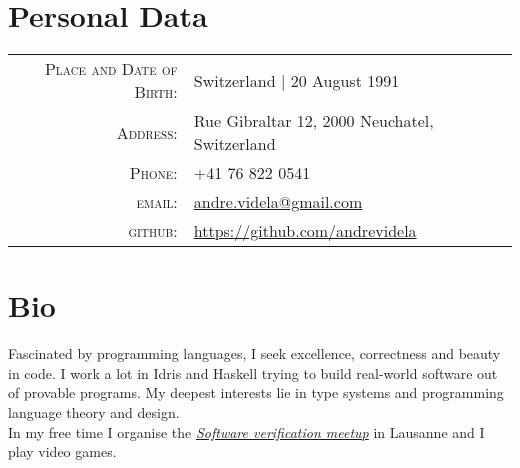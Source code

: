 \documentclass[a4paper,10pt]{article} %
\begin{document}
\pagestyle{empty} %


\par{\bigskip\par} %
\par{\bigskip\par} %
\section{Personal Data}

\begin{tabular}{rl}
\textsc{Place and Date of Birth:} & Switzerland  | 20 August 1991 \\
\textsc{Address:} & Rue Gibraltar 12, 2000 Neuchatel, Switzerland \\
\textsc{Phone:} & +41 76 822 0541\\
\textsc{email:} & \href{mailto:andre.videla@gmail.com}{andre.videla@gmail.com}\\
\textsc{github:} & \href{https://github.com/andrevidela}{https://github.com/andrevidela}
\end{tabular}


\section{Bio}
Fascinated by programming languages, I seek excellence, correctness and beauty in code. I work a lot in Idris and Haskell trying to build real-world software out of provable programs. My deepest interests lie in type systems and programming language theory and design. \\In my free time I organise the \href{https://www.meetup.com/Formal-Methods-and-Verified-software-meetup}{\emph{Software verification meetup}} in Lausanne and I play video games.

\end{document}
